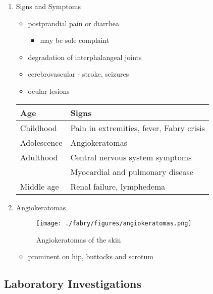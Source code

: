 \documentclass{scrartcl}
\begin{document}
\begin{enumerate}
\item Signs and Symptoms
\label{sec:org37bf1a6}

\begin{itemize}
\item postprandial pain or diarrhea
\begin{itemize}
\item may be sole complaint
\end{itemize}
\item degradation of interphalangeal joints
\item cerebrovascular - stroke, seizures
\item ocular lesions
\end{itemize}


\begin{center}
\begin{tabular}{ll}
Age & Signs\\
\hline
Childhood & Pain in extremities, fever, Fabry crisis \footnotemark\\
Adolescence & Angiokeratomas\\
Adulthood & Central nervous system symptoms\\
 & Myocardial and pulmonary disease\\
Middle age & Renal failure, lymphedema\\
\end{tabular}
\end{center}


\item Angiokeratomas
\label{sec:org40b49a8}


\begin{figure}[htbp]
\centering
\texttt{[image: ./fabry/figures/angiokeratomas.png]}
\caption[Angiokeratomas of the skin]{\label{fig:org6b595d8}
Angiokeratomas of the skin}
\end{figure}

\begin{itemize}
\item prominent on hip, buttocks and scrotum
\end{itemize}
\end{enumerate}

\subsection{Laboratory Investigations}
\label{sec:orgb54a6b3}
\end{document}
